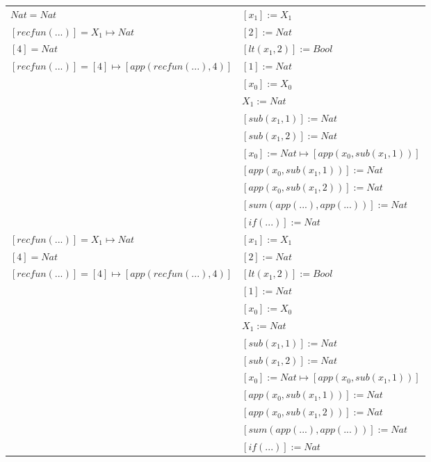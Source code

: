 \begin{exercise}
\begin{description}
\begin{center}
\begin{longtable}{ | l | l | }
                    \hline
                        $Nat = Nat $ & $[x_1] := X_1$ \\
                        $[recfun(...)] = X_1 \mapsto Nat$ & $[2] := Nat$ \\
                        $[4] = Nat$ & $[lt(x_1 , 2)] := Bool$ \\
                        $[recfun(...)] = [4] \mapsto [app(recfun(...), 4)]$ & $[1] := Nat$\\
                        & $[x_0] := X_0$ \\
                        & $X_1 := Nat$ \\
                        & $[sub(x_1,1)] := Nat$ \\
                        & $[sub(x_1,2)] := Nat$ \\
                        & $[x_0] := Nat \mapsto [app(x_0, sub(x_1,1))]$ \\
                        & $[app(x_0, sub(x_1,1))] := Nat$ \\
                        & $[app(x_0, sub(x_1,2))] := Nat$ \\
                        & $[sum(app(...), app(...))] := Nat$ \\
                        & $[if(...)] := Nat $ \\
                    \hline
                        $[recfun(...)] = X_1 \mapsto Nat$ &$[x_1] := X_1$ \\
                        $[4] = Nat$ &  $[2] := Nat$ \\
                        $[recfun(...)] = [4] \mapsto [app(recfun(...), 4)]$ & $[lt(x_1 , 2)] := Bool$ \\
                        & $[1] := Nat$ \\
                        & $[x_0] := X_0$ \\
                        & $X_1 := Nat$  \\
                        & $[sub(x_1,1)] := Nat$ \\
                        & $[sub(x_1,2)] := Nat$ \\
                        & $[x_0] := Nat \mapsto [app(x_0, sub(x_1,1))]$ \\
                        & $[app(x_0, sub(x_1,1))] := Nat$ \\
                        & $[app(x_0, sub(x_1,2))] := Nat$ \\
                        & $[sum(app(...), app(...))] := Nat$ \\
                        & $[if(...)] := Nat $ \\

\end{longtable}
\end{center}
\end{description}
\end{exercise}
